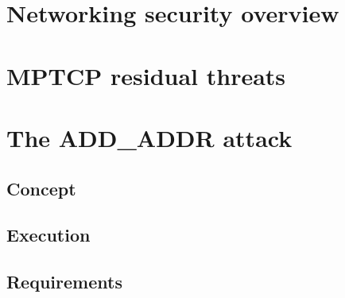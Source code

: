 \section{Networking security overview}
\section{MPTCP residual threats}
\section{The ADD\_ADDR attack}
\subsection{Concept}
\subsection{Execution}
\subsection{Requirements}

